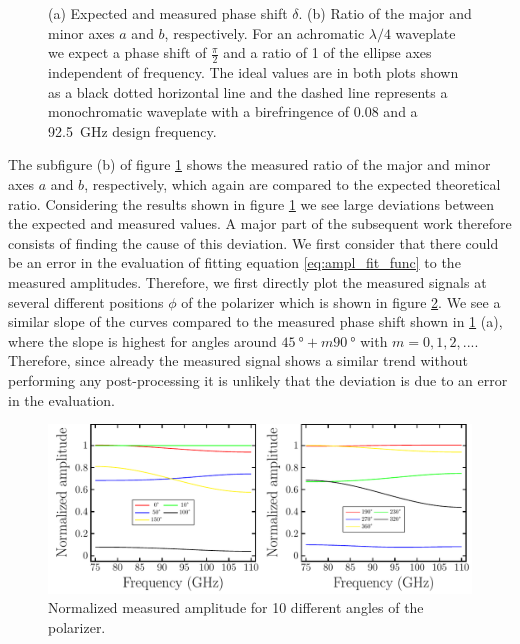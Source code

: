 \begin{figure}[H]
\begin{subfigure}[b]{.5\linewidth}
    \end{subfigure}
    \caption{(a) Expected and measured phase shift $\delta$. (b) Ratio of the major and minor axes $a$ and $b$, respectively. For an achromatic $\lambda/4$ waveplate we expect a phase shift of $\frac{\pi}{2}$ and a ratio of 1 of the ellipse axes independent of frequency. The ideal values are in both plots shown as a black dotted horizontal line and the dashed line represents a monochromatic waveplate with a birefringence of $0.08$ and a \SI{92.5}{\giga \hertz} design frequency.}
    \label{fig:meas_result}
\end{figure}

The subfigure (b) of figure \ref{fig:meas_result} shows the measured ratio of the major and minor axes $a$ and $b$, respectively, which again are compared to the expected theoretical ratio. Considering the results shown in figure \ref{fig:meas_result} we see large deviations between the expected and measured values. A major part of the subsequent work therefore consists of finding the cause of this deviation. We first consider that there could be an error in the evaluation of fitting equation \ref{eq:ampl_fit_func} to the measured amplitudes. Therefore, we first directly plot the measured signals at several different positions $\phi$ of the polarizer which is shown in figure \ref{fig:measured_amplitude}. We see a similar slope of the curves compared to the measured phase shift shown in \ref{fig:meas_result} (a), where the slope is highest for angles around $\SI{45}{\degree}+m\SI{90}{\degree}$ with $m=0,1,2,...$. Therefore, since already the measured signal shows a similar trend without performing any post-processing it is unlikely that the deviation is due to an error in the evaluation.

\begin{figure}[H]
    \centering
    \includegraphics[scale=0.63]{images/results/plots/polymer/measured_amplitude.pdf}
    \caption{Normalized measured amplitude for 10 different angles of the polarizer.}
    \label{fig:measured_amplitude}
\end{figure}

